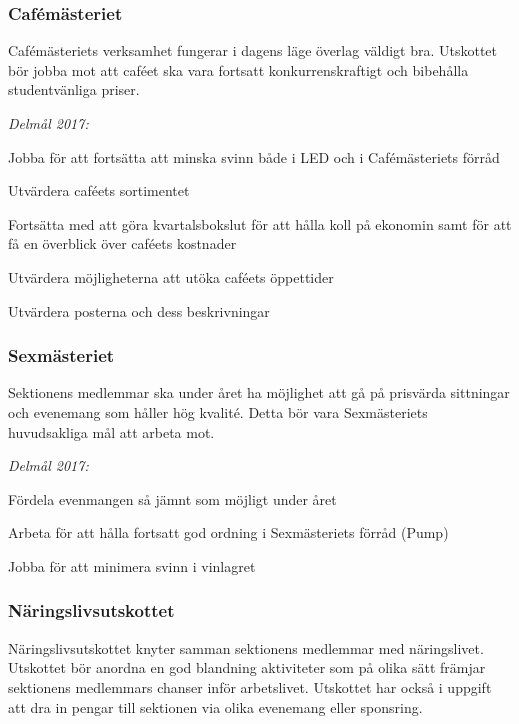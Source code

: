 \documentclass[10pt]{article}
\begin{document}
\subsubsection*{Cafémästeriet}
Cafémästeriets verksamhet fungerar i dagens läge överlag väldigt bra. Utskottet bör jobba mot att caféet ska vara fortsatt konkurrenskraftigt och bibehålla studentvänliga priser.

\emph{Delmål 2017:}
\begin{dashlist}
    \item Jobba för att fortsätta att minska svinn både i LED och i Cafémästeriets förråd
    \item Utvärdera caféets sortimentet
    \item Fortsätta med att göra kvartalsbokslut för att hålla koll på ekonomin samt för att få en överblick över caféets kostnader
    \item Utvärdera möjligheterna att utöka caféets öppettider
    \item Utvärdera posterna och dess beskrivningar
\end{dashlist}

\newpage

\subsubsection*{Sexmästeriet}
Sektionens medlemmar ska under året ha möjlighet att gå på prisvärda sittningar och evenemang som håller hög kvalité. Detta bör vara Sexmästeriets huvudsakliga mål att arbeta mot.

\emph{Delmål 2017:}
\begin{dashlist}
    \item Fördela evenmangen så jämnt som möjligt under året
    \item Arbeta för att hålla fortsatt god ordning i Sexmästeriets förråd (Pump)
    \item Jobba för att minimera svinn i vinlagret
\end{dashlist}

\subsubsection*{Näringslivsutskottet}
Näringslivsutskottet knyter samman sektionens medlemmar med näringslivet. Utskottet bör anordna en god blandning aktiviteter som på olika sätt främjar sektionens medlemmars chanser inför arbetslivet. Utskottet har också i uppgift att dra in pengar till sektionen via olika evenemang eller sponsring.
\end{document}
